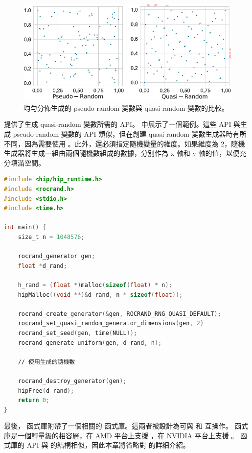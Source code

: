 \begin{figure}[h]
    \centering
    \includegraphics[width=0.7\linewidth]{FileAusiliari/Screenshots/Figure9-3.png}
    \caption{均勻分佈生成的 pseudo-random 變數與 quasi-random 變數的比較。}
    \label{fig:random}
\end{figure}

 提供了生成 quasi-random 變數所需的 API。 中展示了一個範例。這些 API 與生成 pseudo-random 變數的 API 類似，但在創建 quasi-random 變數生成器時有所不同，因為需要使用 。此外，還必須指定隨機變量的維度。如果維度為 2，隨機生成器將生成一組由兩個隨機數組成的數據，分別作為 x 軸和 y 軸的值，以便充分填滿空間。

\begin{lstlisting}[language=C, caption={一個生成 100 萬個 pseudo-random 變數的 \term{rocRAND} 函式。}, captionpos=t, label={lst:quasi}]
#include <hip∕hip_runtime.h>
#include <rocrand.h>
#include <stdio.h>
#include <time.h>

int main() {
    size_t n = 1048576;

    rocrand_generator gen;
    float *d_rand;

    h_rand = (float *)malloc(sizeof(float) * n);
    hipMalloc((void **)&d_rand, n * sizeof(float));

    rocrand_create_generator(&gen, ROCRAND_RNG_QUASI_DEFAULT);
    rocrand_set_quasi_random_generator_dimensions(gen, 2)
    rocrand_set_seed(gen, time(NULL));
    rocrand_generate_uniform(gen, d_rand, n);

    ∕∕ 使用生成的隨機數

    rocrand_destroy_generator(gen);
    hipFree(d_rand);
    return 0;
}
\end{lstlisting}

最後， 函式庫附帶了一個相關的  函式庫。這兩者被設計為可與  和  互操作。 函式庫是一個輕量級的相容層，在 AMD 平台上支援 ，在 NVIDIA 平台上支援 。 函式庫的 API 與  的結構相似，因此本章將省略對  的詳細介紹。

